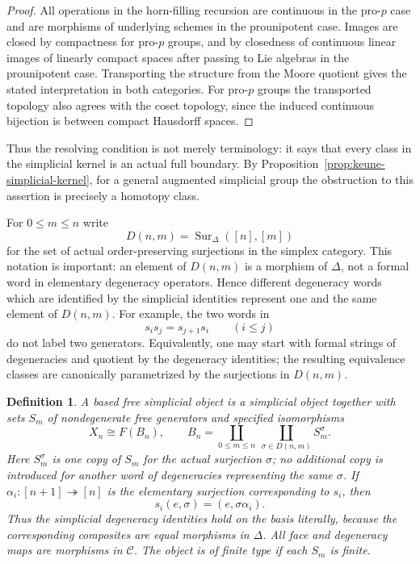 \documentclass[10pt,a4paper]{amsart}
\newtheorem{definition}[theorem]{Definition}
\newcommand{\C}{\mathcal C}
\begin{document}
\begin{proof}
All operations in the horn-filling recursion are continuous in the
pro-$p$ case and are morphisms of underlying schemes in the
prounipotent case. Images are closed by compactness for pro-$p$
groups, and by closedness of continuous linear images of linearly
compact spaces after passing to Lie algebras in the prounipotent
case. Transporting the structure from the Moore quotient gives the
stated interpretation in both categories. For pro-$p$ groups the
transported topology also agrees with the coset topology, since the
induced continuous bijection is between compact Hausdorff spaces.
\end{proof}

Thus the resolving condition is not merely terminology: it says that
every class in the simplicial kernel is an actual full boundary. By
Proposition~\ref{prop:keune-simplicial-kernel}, for a general augmented
simplicial group the obstruction to this assertion is precisely a
homotopy class.

For $0\leq m\leq n$ write
\[
 D(n,m)=\operatorname{Sur}_{\Delta}([n],[m])
\]
for the set of actual order-preserving surjections in the simplex
category. This notation is important: an element of $D(n,m)$ is a
morphism of $\Delta$, not a formal word in elementary degeneracy
operators. Hence different degeneracy words which are identified by the
simplicial identities represent one and the same element of $D(n,m)$.
For example, the two words in
\[
 s_i s_j=s_{j+1}s_i\qquad(i\leq j)
\]
do not label two generators. Equivalently, one may start with formal
strings of degeneracies and quotient by the degeneracy identities; the
resulting equivalence classes are canonically parametrized by the
surjections in $D(n,m)$.

\begin{definition}\label{def:free}
A \emph{based free simplicial object} is a simplicial object together
with sets $S_m$ of nondegenerate free generators and specified
isomorphisms
\begin{equation}\label{eq:basis}
 X_n\cong F(B_n),\qquad
 B_n=\coprod_{0\leq m\leq n}\ \coprod_{\sigma\in D(n,m)}S_m^{\sigma}.
\end{equation}
Here $S_m^{\sigma}$ is one copy of $S_m$ for the actual surjection
$\sigma$; no additional copy is introduced for another word of
degeneracies representing the same $\sigma$. If
$\alpha_i:[n+1]\twoheadrightarrow[n]$ is the elementary surjection
corresponding to $s_i$, then
\[
 s_i(e,\sigma)=(e,\sigma\alpha_i).
\]
Thus the simplicial degeneracy identities hold on the basis literally,
because the corresponding composites are equal morphisms in $\Delta$.
All face and degeneracy maps are morphisms in $\C$. The object is of
\emph{finite type} if each $S_m$ is finite.
\end{definition}
\end{document}
